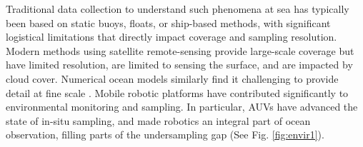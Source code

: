 \documentclass[aoas]{imsart}
\begin{document}
Traditional data collection to understand such phenomena at sea has
typically been based on static buoys, floats, or ship-based methods,
with significant logistical limitations that directly impact coverage
and sampling resolution. Modern methods using satellite remote-sensing
provide large-scale coverage but have limited resolution, are limited
to sensing the surface, and are impacted by cloud cover. Numerical
ocean models similarly find it challenging to provide detail at fine
scale \citep{Lermusiaux:2006}. Mobile robotic platforms
\citep{Bellingham07} have contributed significantly to environmental monitoring and sampling. In particular, AUVs have
advanced the state of in-situ sampling, and made robotics an integral
part of ocean observation, filling parts of the undersampling gap
\cite{rudnick03,rudnick18}(See Fig. \ref{fig:envir1}).

\end{document}
